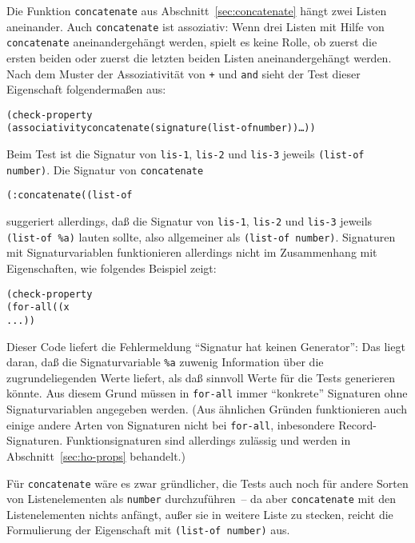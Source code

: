 Die Funktion
\texttt{concatenate} aus
Abschnitt~\ref{sec:concatenate} hängt zwei Listen aneinander.  Auch
\texttt{concatenate} ist assoziativ: Wenn drei Listen mit Hilfe von
\texttt{concatenate} aneinandergehängt werden, spielt es keine Rolle,
ob zuerst die ersten beiden oder zuerst die letzten beiden Listen
aneinandergehängt werden.  Nach dem Muster der Assoziativität von
\texttt{+} und \texttt{and} sieht der Test dieser Eigenschaft
folgendermaßen aus:
%
\begin{alltt}
(check-property
 (associativity concatenate (signature (list-of number)) \ldots))
\end{alltt}
%
Beim Test ist die Signatur von \texttt{lis-1}, \texttt{lis-2} und
\texttt{lis-3} jeweils \texttt{(list-of number)}.  Die Signatur von \texttt{concatenate}
%
\begin{alltt}
(: concatenate ((list-of %a) (list-of %a) -> (list-of %a)))
\end{alltt}
%
suggeriert allerdings, daß die Signatur von \texttt{lis-1},
\texttt{lis-2} und \texttt{lis-3} jeweils \texttt{(list-of \%a)} lauten
sollte, also allgemeiner als \texttt{(list-of number)}.  Signaturen mit
Signaturvariablen funktionieren allerdings nicht im Zusammenhang mit
Eigenschaften, wie folgendes Beispiel zeigt:
%
\begin{alltt}
(check-property
  (for-all ((x %a))
    ...))
\end{alltt}
%
Dieser Code liefert die Fehlermeldung "`Signatur hat keinen
Generator"': Das liegt daran, daß die Signaturvariable \texttt{\%a}
zuwenig Information über die zugrundeliegenden Werte liefert, als daß
\drscheme{} sinnvoll Werte für die Tests generieren könnte.  Aus diesem
Grund müssen in \texttt{for-all} immer "`konkrete"' Signaturen ohne
Signaturvariablen angegeben werden.  (Aus ähnlichen Gründen
funktionieren auch einige andere Arten von Signaturen nicht bei
\texttt{for-all}, inbesondere Record-Signaturen.  Funktionsignaturen sind
allerdings zulässig und werden in Abschnitt~\ref{sec:ho-props} behandelt.)

Für \texttt{concatenate} wäre es zwar gründlicher, die Tests auch noch
für andere Sorten von Listenelementen als \texttt{number}
durchzuführen~-- da aber \texttt{concatenate} mit den Listenelementen
nichts anfängt, außer sie in weitere Liste zu stecken, reicht die
Formulierung der Eigenschaft mit \texttt{(list-of number)} aus.

